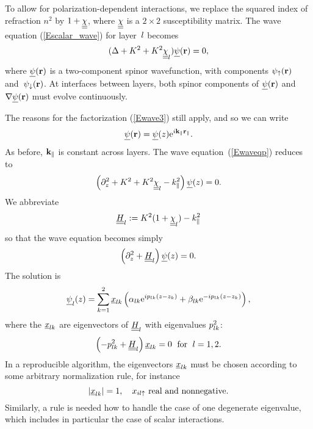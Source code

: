To allow for polarization-dependent interactions,
we replace the squared index of refraction $n^2$
by $1+\underline{\underline{\chi}}$, where $\underline{\underline{\chi}}$ is a $2\times 2$ susceptibility matrix.
The wave equation (\ref{Escalar_wave}) for layer~$l$ becomes
\begin{equation}\label{Ewaveqp}  
(\Delta +K^2 +K^2 \underline{\underline{\chi}}_l) \underline{\psi}(\mathbf{r})= 0,
\end{equation}
where $\underline{\psi}(\mathbf{r})$ is a two-component spinor wavefunction,
with components $\psi_\uparrow(\mathbf{r})$ and~$\psi_\downarrow(\mathbf{r})$.
At interfaces between layers,
both spinor components of $\underline{\psi}(\mathbf{r})$ and $\mathbf{\nabla}\underline{\psi}(\mathbf{r})$
must evolve continuously.

The reasons for the factorization (\ref{Ewave3}) still apply,
and so we can write
\begin{equation}\label{Ewave3p}
\underline{\psi}(\mathbf{r}) = \underline{\psi}(z) \text{e}^{i \mathbf{k}_\parallel\mathbf{r}_\parallel}.
\end{equation}
As before, $\mathbf{k}_\parallel$ is constant across layers.
The wave equation~(\ref{Ewaveqp}) reduces to 
\begin{equation}\label{Ewavezp}
\left(\partial_z^2 + K^2 + K^2\underline{\underline{\chi}}_l - k_\parallel^2 \right) \underline{\psi}(z) = 0.
\end{equation}
We abbreviate
\begin{equation}
  \underline{\underline{H}}_l := K^2(1+\underline{\underline{\chi}}_l)-k_\parallel^2
\end{equation}
so that the wave equation becomes simply
\begin{equation}\label{Ewaveqp2}
  \left(\partial_z^2 + \underline{\underline{H}}_l\right) \underline{\psi}(z) = 0.
\end{equation}
The solution is
\begin{equation}\label{Epsizp}
  \underline{\psi}_l(z)
  = \sum_{k=1}^2 \underline{x}_{l k}\left(\alpha_{l k}\text{e}^{i p_{l k}(z-z_k)}
                            + \beta_{l k}\text{e}^{-i p_{l k}(z-z_k)}\right),
\end{equation}
where the $\underline{x}_{l k}$ are eigenvectors of $\underline{\underline{H}}_l$
with eigenvalues $p_{l k}^2$:
\begin{equation}
  \left( -p_{l k}^2 + \underline{\underline{H}}_l \right) \underline{x}_{l k} = 0
   \;\text{ for }\;l=1,2.
\end{equation}
In a reproducible algorithm,
the eigenvectors $\underline{x}_{l k}$ must be chosen according to some arbitrary
normalization rule,
for instance
\begin{equation}
  |\underline{x}_{l k}|=1,\quad x_{il\uparrow} \text{ real and nonnegative}.
\end{equation}
Similarly,
a rule is needed how to handle the case of one degenerate eigenvalue,
which includes in particular the case of scalar interactions.


